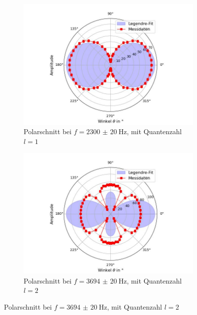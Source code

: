 \documentclass[../main.tex]{subfiles}
\begin{document}
        \begin{figure}[H]
            \centering
            \begin{subfigure}[b]{0.45\textwidth}
                \centering
                \includegraphics[width=\textwidth]{Bilddateien/Auswertung/II_i_Polschnitt_2300_10.jpg}
                \caption{Polarschnitt bei $f=\SI{2300(20)}{\hertz}$, mit Quantenzahl $l=1$}
                \label{fig:II_i_Polschnitt_2300_10}
            \end{subfigure}
            \hfill
            \begin{subfigure}[b]{0.45\textwidth}
                \centering
                \includegraphics[width=\textwidth]{Bilddateien/Auswertung/II_i_Polschnitt_3694_20.jpg}
                \caption{Polarschnitt bei $f=\SI{3694(20)}{\hertz}$, mit Quantenzahl $l=2$}

\end{subfigure}
\end{figure}
\end{document}

